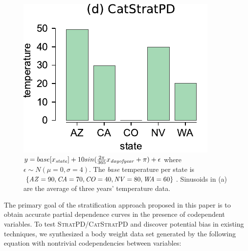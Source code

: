 \documentclass[]{article} %
\newcommand{\spd}{\fontfamily{cmr}\textsc{\small StratPD}}
\newcommand{\cspd}{\fontfamily{cmr}\textsc{\small CatStratPD}}
\begin{document}
\begin{figure}[!htbp]
\begin{center}
\includegraphics[scale=0.45]{images/state_vs_temp_stratpd.pdf}\vspace{-1mm}
\caption{\small $y = base[x_{\it state}] + 10 sin(\frac{2\pi}{365}x_{\it dayofyear}+\pi) + \epsilon$ where $\epsilon \sim N(\mu=0, \sigma=4)$. The {\em base} temperature per state is $\{{\it AZ}=90, {\it CA}=70, {\it CO}=40, {\it NV}=80, {\it WA}=60\}$. Sinusoids in (a) are the average of three years' temperature data.}
\label{fig:statetemp}
\end{center}
\end{figure}

The primary goal of the stratification approach proposed in this paper is to obtain accurate partial dependence curves in the presence of codependent variables. To test \spd{}/\cspd{} and discover potential bias in existing techniques, we synthesized a body weight data set generated by the following equation with nontrivial codependencies between variables: 
\vspace{-1mm}
\end{document}
